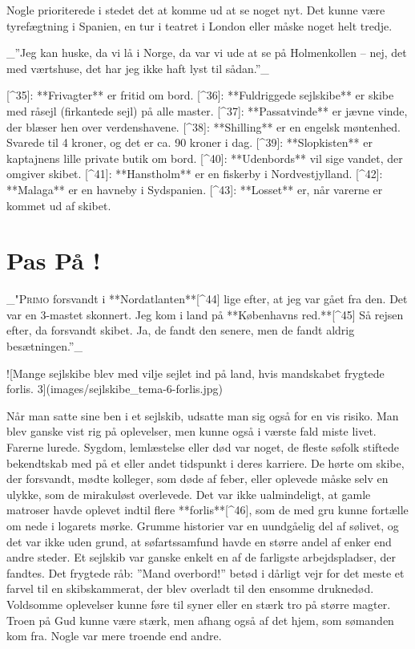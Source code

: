 \documentclass{book}
\begin{document}
Nogle prioriterede i stedet det at komme ud at se noget nyt. Det kunne være tyrefægtning i
Spanien, en tur i teatret i London eller måske noget helt tredje.

_”Jeg kan huske, da vi lå i Norge, da var vi ude at se på Holmenkollen – nej, det med
værtshuse, det har jeg ikke haft lyst til sådan.”_

[^35]: **Frivagter** er fritid om bord.
[^36]: **Fuldriggede sejlskibe** er skibe med råsejl (firkantede sejl) på alle
  master.
[^37]: **Passatvinde** er jævne vinde, der blæser hen over verdenshavene.
[^38]: **Shilling** er en engelsk møntenhed. Svarede til 4 kroner, og det er ca.
  90 kroner i dag.
[^39]: **Slopkisten** er kaptajnens lille private butik om bord.
[^40]: **Udenbords** vil sige vandet, der omgiver skibet.
[^41]: **Hanstholm** er en fiskerby i Nordvestjylland.
[^42]: **Malaga** er en havneby i Sydspanien.
[^43]: **Losset** er, når varerne er kommet ud af skibet.

\chapter{Pas På !}

 _"\textsc{Primo} forsvandt i **Nordatlanten**[^44] lige efter, at jeg var gået fra den. Det var
 en 3-mastet skonnert. Jeg kom i land på **Københavns red.**[^45] Så rejsen efter, da forsvandt
 skibet. Ja, de fandt den senere, men de fandt aldrig besætningen.”_

![Mange sejlskibe blev med vilje sejlet ind på land, hvis mandskabet frygtede forlis. {3}](images/sejlskibe_tema-6-forlis.jpg)

Når man satte sine ben i et sejlskib, udsatte man sig også for en vis risiko. Man blev
ganske vist rig på oplevelser, men kunne også i værste fald miste livet. Farerne lurede.
Sygdom, lemlæstelse eller død var noget, de fleste søfolk stiftede bekendtskab med på et
eller andet tidspunkt i deres karriere. De hørte om skibe, der forsvandt, mødte kolleger,
som døde af feber, eller oplevede måske selv en ulykke, som de mirakuløst overlevede. Det
var ikke ualmindeligt, at gamle matroser havde oplevet indtil flere **forlis**[^46], som de med gru
kunne fortælle om nede i logarets mørke. Grumme historier var en uundgåelig del af
sølivet, og det var ikke uden grund, at søfartssamfund havde en større andel af enker end
andre steder. Et sejlskib var ganske enkelt en af de farligste arbejdspladser, der
fandtes. Det frygtede råb: ”Mand overbord!” betød i dårligt vejr for det meste et farvel
til en skibskammerat, der blev overladt til den ensomme druknedød. Voldsomme oplevelser
kunne føre til syner eller en stærk tro på større magter. Troen på Gud kunne være stærk,
men afhang også af det hjem, som sømanden kom fra. Nogle var mere troende end andre.
\end{document}
